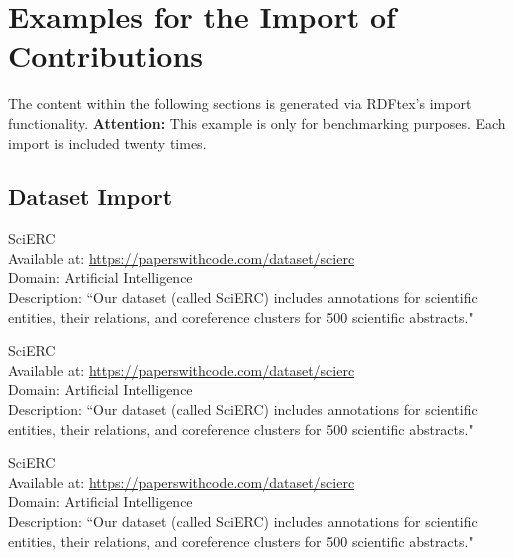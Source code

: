 
\section{Examples for the Import of Contributions}

The content within the following sections is generated via RDFtex's import functionality. \textbf{Attention:} This example is only for benchmarking purposes. Each import is included twenty times. 


\subsection{Dataset Import}

\begin{dataset}
SciERC~\cite{DBLP:conf/emnlp/LuanHOH18}\\
Available at: \url{https://paperswithcode.com/dataset/scierc}\\
Domain: Artificial Intelligence\\
Description: ``Our dataset (called SciERC) includes annotations for scientific entities, their relations, and coreference clusters for 500 scientific abstracts."~\cite{DBLP:conf/emnlp/LuanHOH18}
\label{dataset:scierc0}
\end{dataset}
\begin{dataset}
SciERC~\cite{DBLP:conf/emnlp/LuanHOH18}\\
Available at: \url{https://paperswithcode.com/dataset/scierc}\\
Domain: Artificial Intelligence\\
Description: ``Our dataset (called SciERC) includes annotations for scientific entities, their relations, and coreference clusters for 500 scientific abstracts."~\cite{DBLP:conf/emnlp/LuanHOH18}
\label{dataset:scierc1}
\end{dataset}
\begin{dataset}
SciERC~\cite{DBLP:conf/emnlp/LuanHOH18}\\
Available at: \url{https://paperswithcode.com/dataset/scierc}\\
Domain: Artificial Intelligence\\
Description: ``Our dataset (called SciERC) includes annotations for scientific entities, their relations, and coreference clusters for 500 scientific abstracts."~\cite{DBLP:conf/emnlp/LuanHOH18}
\label{dataset:scierc2}
\end{dataset}
